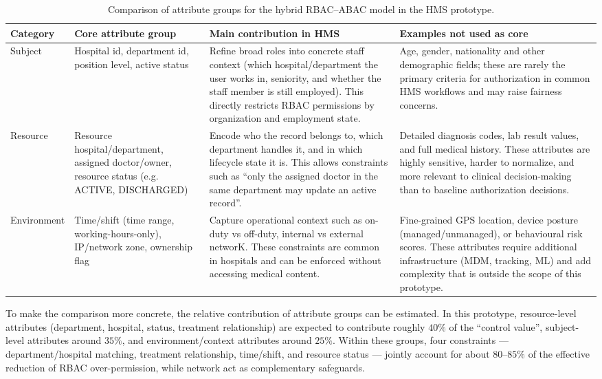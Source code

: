 \begin{table}[H]
\centering
\renewcommand{\arraystretch}{1.2}
\begin{tabular}{|p{2.4cm}|p{3.6cm}|p{5.1cm}|p{4.1cm}|}
\hline
\textbf{Category} & \textbf{Core attribute group} & \textbf{Main contribution in HMS} & \textbf{Examples not used as core} \\
\hline
Subject &
Hospital id, department id, position level, active status &
Refine broad roles into concrete staff context (which hospital/department the user works in,
seniority, and whether the staff member is still employed). This directly restricts RBAC permissions
by organization and employment state. &
Age, gender, nationality and other demographic fields; these are rarely the primary criteria for
authorization in common HMS workflows and may raise fairness concerns. \\
\hline
Resource &
Resource hospital/department, assigned doctor/owner, resource status (e.g. ACTIVE, DISCHARGED) &
Encode who the record belongs to, which department handles it, and in which lifecycle state it is.
This allows constraints such as ``only the assigned doctor in the same department may update an
active record''. &
Detailed diagnosis codes, lab result values, and full medical history. These attributes are highly
sensitive, harder to normalize, and more relevant to clinical decision-making than to baseline
authorization decisions. \\
\hline
Environment &
Time/shift (time range, working-hours-only), IP/network zone, ownership flag &
Capture operational context such as on-duty vs off-duty, internal vs external networK. These constraints are common in hospitals and can be enforced without accessing medical
content. &
Fine-grained GPS location, device posture (managed/unmanaged), or behavioural risk scores. These
attributes require additional infrastructure (MDM, tracking, ML) and add complexity that is outside
the scope of this prototype. \\
\hline
\end{tabular}
\caption{Comparison of attribute groups for the hybrid RBAC--ABAC model in the HMS prototype.}
\label{tab:attribute-comparison}
\end{table}

To make the comparison more concrete, the relative contribution of attribute groups can be estimated. In this prototype, resource-level attributes (department, hospital, status, treatment
relationship) are expected to contribute roughly $40\%$ of the ``control value'', subject-level attributes
around $35\%$, and environment/context attributes around $25\%$. Within these groups, four constraints
--- department/hospital matching, treatment relationship, time/shift, and resource status --- jointly
account for about $80$--$85\%$ of the effective reduction of RBAC over-permission, while network act as complementary safeguards.


